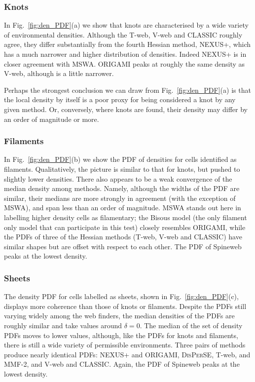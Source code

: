 \documentclass[useAMS,usenatbib]{mnras}
\newcommand{\bisous}{Bisous}
\newcommand{\classic}{\textsc{CLASSIC}}
\newcommand{\disperse}{\textsc{DisPerSE}}
\newcommand{\origami}{\textsc{ORIGAMI}}
\newcommand{\nexus}{\textsc{NEXUS+}}
\newcommand{\tweb}{T-web}
\newcommand{\vweb}{V-web}
\newcommand{\mswa}{\textsc{MSWA}}
\newcommand{\mmft}{\textsc{MMF-2}}
\newcommand{\spine}{Spineweb}
\begin{document}
\subsubsection{Knots} 
In Fig.~\ref{fig:den_PDF}(a) we show that knots are characterised by a wide variety of environmental densities. Although the \tweb{}, \vweb{} and \classic{} roughly agree, they differ substantially from the fourth Hessian method, \nexus{}, which has a much narrower and higher distribution of densities. Indeed \nexus{} is in closer agreement with \mswa{}. \origami{} peaks at roughly the same density as \vweb{}, although is a little narrower.

Perhaps the strongest conclusion we can draw from Fig.~\ref{fig:den_PDF}(a) is that the local density by itself is a poor proxy for being considered a knot by any given method. Or, conversely, where knots are found, their density may differ by an order of magnitude or more.

\subsubsection{Filaments} 
In Fig.~\ref{fig:den_PDF}(b) we show the PDF of densities for cells identified as filaments. Qualitatively, the picture is similar to that for knots, but pushed to slightly lower densities. There also appears to be a weak convergence of the median density among methods. Namely, although the widths of the PDF are similar, their medians are more strongly in agreement (with the exception of \mswa{}), and span less than an order of magnitude. \mswa{} stands out here in labelling higher density cells as filamentary; the \bisous{} model (the only filament only model that can participate in this test) closely resembles \origami{}, while the PDFs of three of the Hessian methods (\tweb{}, \vweb{} and \classic{}) have similar shapes but are offset with respect to each other. The PDF of \spine{} peaks at the lowest density.

\subsubsection{Sheets}
The density PDF for cells labelled as sheets, shown in Fig.~\ref{fig:den_PDF}(c), displays more coherence  than those of knots or filaments. Despite the PDFs still varying widely among the web finders, the median densities of the PDFs are roughly similar and take values around $\delta=0$.
The median of the set of density PDFs moves to lower values, although, like the PDFs for knots and filaments, there is still a wide variety of permissible environments. Three pairs of methods produce nearly identical PDFs: \nexus{} and \origami{}, \disperse{}, \tweb{}, and \mmft{}, and \vweb{} and \classic{}. Again, the PDF of \spine{} peaks at the lowest density.
\end{document}
